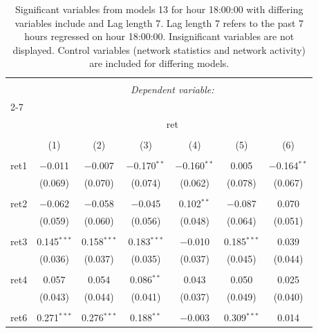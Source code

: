 
\begin{table}[!htbp] \centering 
  \caption{Significant variables from models 13 for hour 18:00:00 with differing variables include 
                               and Lag length 7. Lag length 7 refers to the past 7 hours regressed on hour 18:00:00. 
                               Insignificant variables are not displayed. 
                               Control variables (network statistics and network activity) are 
                               included for differing models.} 
  \label{RVmodels1_t_hourlagged5} 
\scriptsize 
\begin{tabular}{@{\extracolsep{5pt}}lcccccc} 
\\[-1.8ex]\hline 
\hline \\[-1.8ex] 
 & \multicolumn{6}{c}{\textit{Dependent variable:}} \\ 
\cline{2-7} 
\\[-1.8ex] & \multicolumn{6}{c}{ret} \\ 
\\[-1.8ex] & (1) & (2) & (3) & (4) & (5) & (6)\\ 
\hline \\[-1.8ex] 
 ret1 & $-$0.011 & $-$0.007 & $-$0.170$^{**}$ & $-$0.160$^{**}$ & 0.005 & $-$0.164$^{**}$ \\ 
  & (0.069) & (0.070) & (0.074) & (0.062) & (0.078) & (0.067) \\ 
  & & & & & & \\ 
 ret2 & $-$0.062 & $-$0.058 & $-$0.045 & 0.102$^{**}$ & $-$0.087 & 0.070 \\ 
  & (0.059) & (0.060) & (0.056) & (0.048) & (0.064) & (0.051) \\ 
  & & & & & & \\ 
 ret3 & 0.145$^{***}$ & 0.158$^{***}$ & 0.183$^{***}$ & $-$0.010 & 0.185$^{***}$ & 0.039 \\ 
  & (0.036) & (0.037) & (0.035) & (0.037) & (0.045) & (0.044) \\ 
  & & & & & & \\ 
 ret4 & 0.057 & 0.054 & 0.086$^{**}$ & 0.043 & 0.050 & 0.025 \\ 
  & (0.043) & (0.044) & (0.041) & (0.037) & (0.049) & (0.040) \\ 
  & & & & & & \\ 
 ret6 & 0.271$^{***}$ & 0.276$^{***}$ & 0.188$^{**}$ & $-$0.003 & 0.309$^{***}$ & 0.014 \\ 

\end{tabular}
\end{table}
